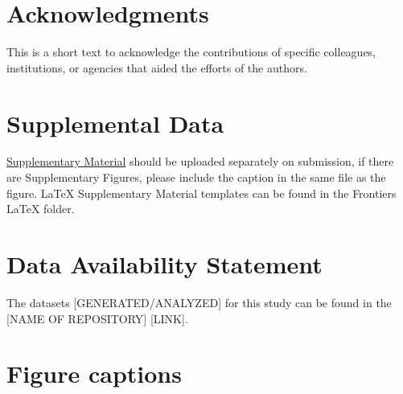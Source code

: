 \documentclass[utf8]{frontiersSCNS} %
\begin{document}
\section*{Acknowledgments}
This is a short text to acknowledge the contributions of specific colleagues, institutions, or agencies that aided the efforts of the authors.

\section*{Supplemental Data}
 \href{http://home.frontiersin.org/about/author-guidelines#SupplementaryMaterial}{Supplementary Material} should be uploaded separately on submission, if there are Supplementary Figures, please include the caption in the same file as the figure. LaTeX Supplementary Material templates can be found in the Frontiers LaTeX folder.

\section*{Data Availability Statement}
The datasets [GENERATED/ANALYZED] for this study can be found in the [NAME OF REPOSITORY] [LINK].




\section*{Figure captions}

\end{document}
